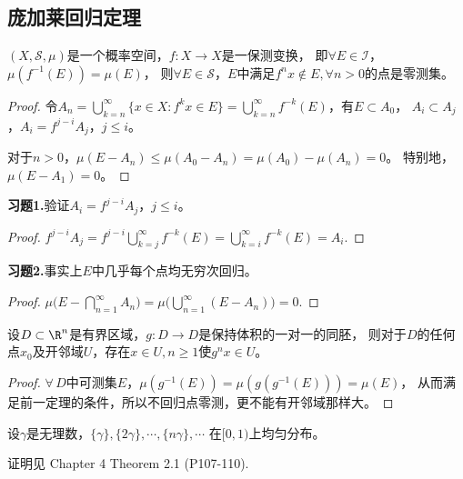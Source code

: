 \subsection{庞加莱回归定理}

\begin{theorem}
    $(X,\mathscr{S},\mu)$是一个概率空间，$f\colon X\to X$是一保测变换，
    即$\forall E\in\mathscr{I}$，$\mu(f^{-1}(E))=\mu(E)$，
    则$\forall E\in\mathscr{S}$，$E$中满足$f^nx\notin E,\forall n>0$的点是零测集。
\end{theorem}

\begin{proof}
    令$A_n=\bigcup\limits_{k=n}^\infty\{x\in X:f^kx\in E\}
    =\bigcup\limits_{k=n}^\infty f^{-k}(E)$，有$E\subset A_0$，
    $A_i\subset A_j$，$A_i=f^{j-i}A_j$，$j\le i$。

    对于$n>0$，$\mu(E-A_n)\le\mu(A_0-A_n)=\mu(A_0)-\mu(A_n)=0$。
    特别地，$\mu(E-A_1)=0$。
\end{proof}

\textbf{习题1.}验证$A_i=f^{j-i}A_j$，$j\le i$。
\begin{proof}
    $f^{j-i}A_j=f^{j-i}\bigcup\limits_{k=j}^\infty f^{-k}(E)
    =\bigcup\limits_{k=i}^\infty f^{-k}(E)=A_i$.
\end{proof}

\textbf{习题2.}事实上$E$中几乎每个点均无穷次回归。
\begin{proof}
    $\mu\big(E-\bigcap\limits_{n=1}^\infty A_n\big)
    =\mu\big(\bigcup\limits_{n=1}^\infty (E-A_n)\big)=0$.
\end{proof}

\begin{theorem}[弱的版本]
    设$D\subset\R^n$是有界区域，$g\colon D\to D$是保持体积的一对一的同胚，
    则对于$D$的任何点$x_0$及开邻域$U$，存在$x\in U,n\ge1$使$g^nx\in U$。
\end{theorem}

\begin{proof}
    $\forall\,D$中可测集$E$，$\mu(g^{-1}(E))=\mu(g(g^{-1}(E)))=\mu(E)$，
    从而满足前一定理的条件，所以不回归点零测，更不能有开邻域那样大。
\end{proof}

\begin{theorem}
    设$\gamma$是无理数，$\{\gamma\},\{2\gamma\},\cdots,\{n\gamma\},\cdots$
    在$[0,1)$上均匀分布。
\end{theorem}

证明见\cite{SS} Chapter 4 Theorem 2.1 (P107-110).

